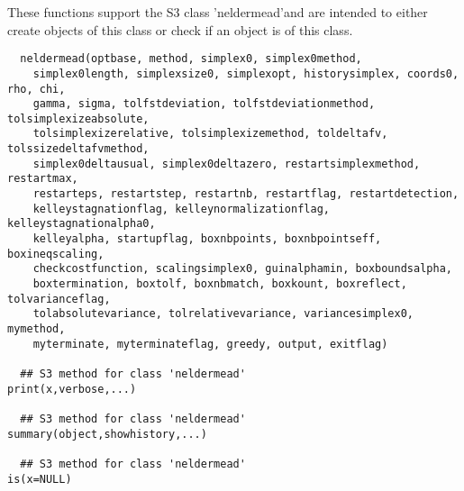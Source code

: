 %
\begin{Description}\relax
These functions support the S3 class 'neldermead'and are intended to 
either create objects of this class or check if an object is of this class.
\end{Description}
%
\begin{Usage}
\begin{verbatim}
  neldermead(optbase, method, simplex0, simplex0method, 
    simplex0length, simplexsize0, simplexopt, historysimplex, coords0, rho, chi, 
    gamma, sigma, tolfstdeviation, tolfstdeviationmethod, tolsimplexizeabsolute, 
    tolsimplexizerelative, tolsimplexizemethod, toldeltafv, tolssizedeltafvmethod,
    simplex0deltausual, simplex0deltazero, restartsimplexmethod, restartmax, 
    restarteps, restartstep, restartnb, restartflag, restartdetection, 
    kelleystagnationflag, kelleynormalizationflag, kelleystagnationalpha0, 
    kelleyalpha, startupflag, boxnbpoints, boxnbpointseff, boxineqscaling, 
    checkcostfunction, scalingsimplex0, guinalphamin, boxboundsalpha, 
    boxtermination, boxtolf, boxnbmatch, boxkount, boxreflect, tolvarianceflag, 
    tolabsolutevariance, tolrelativevariance, variancesimplex0, mymethod, 
    myterminate, myterminateflag, greedy, output, exitflag)
    
  ## S3 method for class 'neldermead'
print(x,verbose,...)
  
  ## S3 method for class 'neldermead'
summary(object,showhistory,...)
  
  ## S3 method for class 'neldermead'
is(x=NULL)
  
\end{verbatim}
\end{Usage}
%

